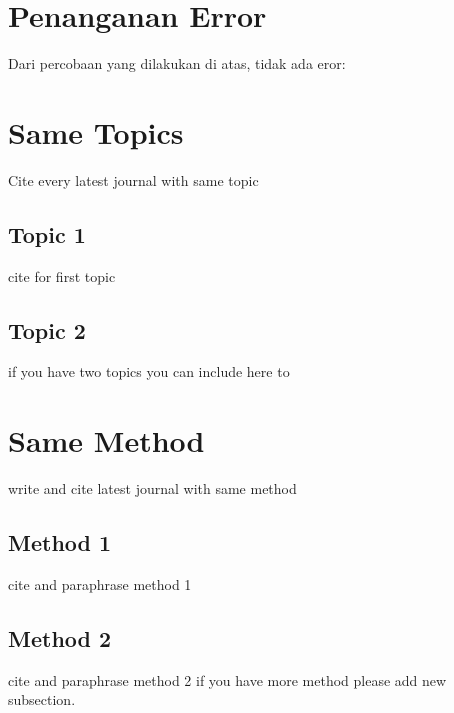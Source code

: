 \section{Penanganan Error}
Dari percobaan yang dilakukan di atas, tidak ada eror:


\section{Same Topics}
Cite every latest journal with same topic
\subsection{Topic 1}
cite for first topic

\subsection{Topic 2}
if you have two topics you can include here to


\section{Same Method}
write and cite latest journal with same method

\subsection{Method 1}
cite and paraphrase method 1

\subsection{Method 2}
cite and paraphrase method 2 if you have more method please add new subsection.

 

